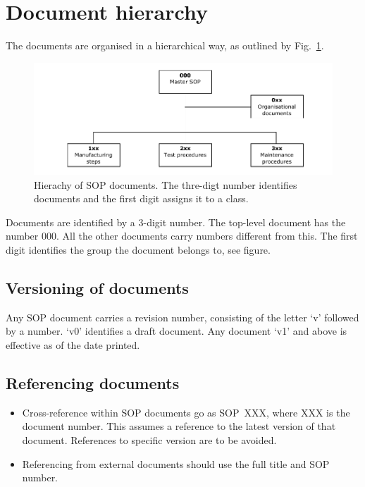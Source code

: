 \documentclass[12pt]{unlsilabsop}
\begin{document}
\section{Document hierarchy}
The documents are organised in a hierarchical way, as outlined by Fig.~\ref{fig:SOPhierarchy}.
\begin{figure}[h]
    \begin{center}
        \includegraphics[width=16cm]{img/SOPhierarchy.pdf}
        \caption{Hierachy of SOP documents. The thre-digt number identifies documents and the first digit assigns it to a class.}
        \label{fig:SOPhierarchy}
    \end{center}
\end{figure}
Documents are identified by a 3-digit number. The top-level document has the number 000. All the other documents carry numbers different from this. The first digit identifies the group the document belongs to, see figure.

\subsection{Versioning of documents}
Any SOP document carries a revision number, consisting of the letter `v' followed by a number. `v0' identifies a draft document. Any document `v1' and above is effective as of the date printed.

\subsection{Referencing documents}
\begin{itemize}
\item Cross-reference within SOP documents go as SOP~XXX, where XXX is the document number. This assumes a reference to the latest version of that document. References to specific version are to be avoided.
\item Referencing from external documents should use the full title and SOP number.
\end{itemize}
\end{document}
